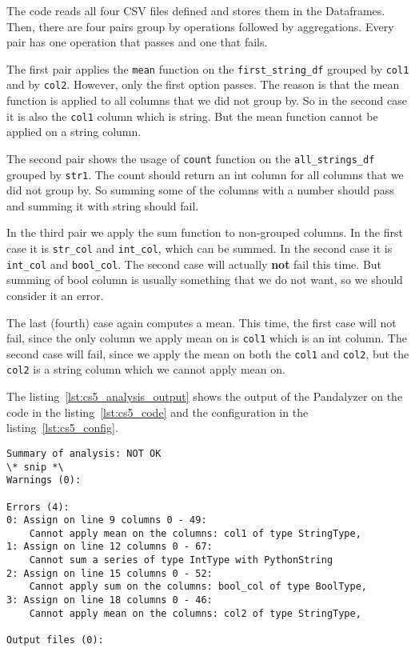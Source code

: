 The code reads all four CSV files defined and stores them in the Dataframes.
Then, there are four pairs group by operations followed by aggregations.
Every pair has one operation that passes and one that fails.

The first pair applies the \verb|mean| function on the \verb|first_string_df| grouped by \verb|col1| and by \verb|col2|.
However, only the first option passes.
The reason is that the mean function is applied to all columns that we did not group by.
So in the second case it is also the \verb|col1| column which is string.
But the mean function cannot be applied on a string column.

The second pair shows the usage of \verb|count| function on the \verb|all_strings_df| grouped by \verb|str1|.
The count should return an int column for all columns that we did not group by.
So summing some of the columns with a number should pass and summing it with string should fail.

In the third pair we apply the sum function to non-grouped columns.
In the first case it is \verb|str_col| and \verb|int_col|, which can be summed.
In the second case it is \verb|int_col| and \verb|bool_col|.
The second case will actually \textbf{not} fail this time.
But summing of bool column is usually something that we do not want, so we should consider it an error.

The last (fourth) case again computes a mean.
This time, the first case will not fail, since the only column we apply mean on is \verb|col1| which is an int column.
The second case will fail, since we apply the mean on both the \verb|col1| and \verb|col2|, but the \verb|col2| is
a string column which we cannot apply mean on.

The listing~\ref{lst:cs5_analysis_output} shows the output of the Pandalyzer on the code in the listing~\ref{lst:cs5_code}
and the configuration in the listing~\ref{lst:cs5_config}.

\begin{lstlisting}[caption=Analysis output of the fifth case study, label={lst:cs5_analysis_output}, captionpos=b]
Summary of analysis: NOT OK
\* snip *\
Warnings (0):

Errors (4):
0: Assign on line 9 columns 0 - 49:
    Cannot apply mean on the columns: col1 of type StringType,
1: Assign on line 12 columns 0 - 67:
    Cannot sum a series of type IntType with PythonString
2: Assign on line 15 columns 0 - 52:
    Cannot apply sum on the columns: bool_col of type BoolType,
3: Assign on line 18 columns 0 - 46:
    Cannot apply mean on the columns: col2 of type StringType,

Output files (0):
\end{lstlisting}


